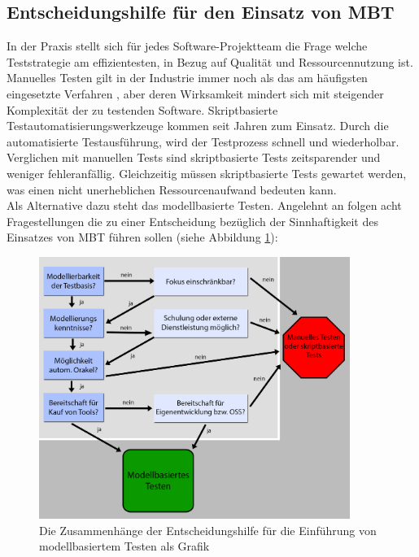 

\subsection{Entscheidungshilfe für den Einsatz von MBT}
\label{sec:entscheidungshilfe}
In der Praxis stellt sich für jedes Software-Projektteam die Frage welche Teststrategie am effizientesten, in Bezug auf Qualität und Ressourcennutzung ist. Manuelles Testen gilt in der Industrie immer noch als das am häufigsten eingesetzte Verfahren \cite{guldali_starthilfe_2010}, aber deren Wirksamkeit mindert sich mit steigender Komplexität der zu testenden Software. Skriptbasierte Testautomatisierungswerkzeuge kommen seit Jahren zum Einsatz. Durch die automatisierte Testausführung, wird der Testprozess schnell und wiederholbar. Verglichen mit manuellen Tests sind skriptbasierte Tests zeitsparender und weniger fehleranfällig. Gleichzeitig müssen skriptbasierte Tests gewartet werden, was einen nicht unerheblichen Ressourcenaufwand bedeuten kann.\\
Als Alternative dazu steht das modellbasierte Testen. Angelehnt an \citeauthor{guldali_starthilfe_2010} \cite{guldali_starthilfe_2010} folgen acht Fragestellungen die zu einer Entscheidung bezüglich der Sinnhaftigkeit des Einsatzes von MBT führen sollen (siehe Abbildung \ref{fig:entscheidungshilfe_mbt}):

\begin{figure}[h] 
  \centering
     \includegraphics[width=0.9\textwidth]{figures/entscheidungshilfe_mbt.png}
  \caption{Die Zusammenhänge der Entscheidungshilfe für die Einführung von modellbasiertem Testen als Grafik}
  \label{fig:entscheidungshilfe_mbt}
\end{figure}

